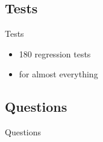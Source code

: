 \documentclass[14pt]{beamer}
\begin{document}
\subsection{Tests}
\begin{frame}{Tests}
\begin{itemize}
    \item 180 regression tests
    \item for almost everything
\end{itemize}
\end{frame}

\subsection{Questions}
\begin{frame}{Questions}
\begin{center}
\end{center}
\end{frame}
\end{document}

